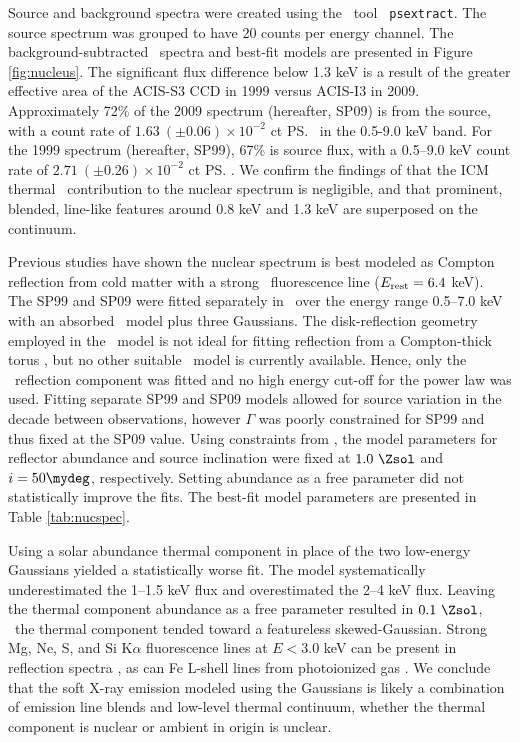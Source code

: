 \documentclass[useAMS,usenatbib]{mn2e}
\begin{document}
Source and background spectra were created using the \ciao\ tool {\tt
  psextract}. The source spectrum was grouped to have 20 counts per
energy channel. The background-subtracted \chandra\ spectra and
best-fit models are presented in Figure \ref{fig:nucleus}. The
significant flux difference below 1.3 keV is a result of the greater
effective area of the ACIS-S3 CCD in 1999 versus ACIS-I3 in
2009. Approximately 72\% of the 2009 spectrum (hereafter, SP09) is
from the source, with a count rate of $1.63 ~(\pm 0.06) \times
10^{-2}$ ct \ps\ in the 0.5-9.0 keV band. For the 1999 spectrum
(hereafter, SP99), 67\% is source flux, with a 0.5--9.0 keV count rate
of $2.71 ~(\pm 0.26) \times 10^{-2}$ ct \ps. We confirm the findings
of \citet{2001MNRAS.321L..15I} that the ICM thermal
\feka\ contribution to the nuclear spectrum is negligible, and that
prominent, blended, line-like features around 0.8 keV and 1.3 keV are
superposed on the continuum.

Previous studies have shown the nuclear spectrum is best modeled as
Compton reflection from cold matter with a strong \feka\ fluorescence
line ($E_{\rm{rest}} = 6.4$ keV). The SP99 and SP09 were fitted
separately in \xspec\ over the energy range 0.5--7.0 keV with an
absorbed \pexrav\ model \citep{pexrav} plus three Gaussians. The
disk-reflection geometry employed in the \pexrav\ model is not ideal
for fitting reflection from a Compton-thick torus
\citep{2009MNRAS.397.1549M}, but no other suitable \xspec\ model is
currently available. Hence, only the \pexrav\ reflection component was
fitted and no high energy cut-off for the power law was used. Fitting
separate SP99 and SP09 models allowed for source variation in the
decade between observations, however $\Gamma$ was poorly constrained
for SP99 and thus fixed at the SP09 value. Using constraints from
\citet{2000AJ....120..562T}, the model parameters for reflector
abundance and source inclination were fixed at $1.0 ~\Zsol$ and $i =
50\mydeg$, respectively. Setting abundance as a free parameter did not
statistically improve the fits. The best-fit model parameters are
presented in Table \ref{tab:nucspec}.

Using a solar abundance thermal component in place of the two
low-energy Gaussians yielded a statistically worse fit. The model
systematically underestimated the 1--1.5 keV flux and overestimated the
2--4 keV flux. Leaving the thermal component abundance as a free
parameter resulted in $0.1 ~\Zsol$, \ie\ the thermal component tended
toward a featureless skewed-Gaussian. Strong Mg, Ne, S, and Si
K$\alpha$ fluorescence lines at $E < 3.0$ keV can be present in
reflection spectra \citep{1991MNRAS.249..352G}, as can Fe L-shell
lines from photoionized gas \citep{1990ApJ...362...90B}. We conclude
that the soft X-ray emission modeled using the Gaussians is likely a
combination of emission line blends and low-level thermal continuum,
whether the thermal component is nuclear or ambient in origin is
unclear.
\end{document}
